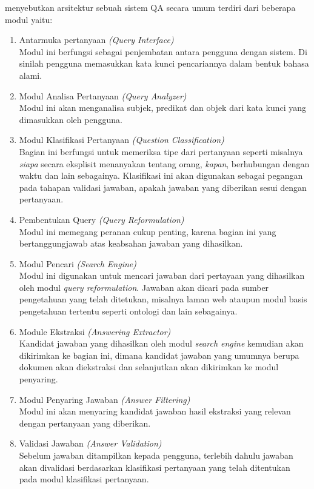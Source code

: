\citet*{ramprasath_hariharan} menyebutkan arsitektur sebuah sistem QA secara umum terdiri dari beberapa modul yaitu:
\begin{enumerate}
	\item Antarmuka pertanyaan \emph{(Query Interface)} \\
		Modul ini berfungsi sebagai penjembatan antara pengguna dengan sistem. Di sinilah pengguna memasukkan kata kunci pencariannya dalam bentuk bahasa alami.
	\item Modul Analisa Pertanyaan \emph{(Query Analyzer)} \\
		Modul ini akan menganalisa subjek, predikat dan objek dari kata kunci yang dimasukkan oleh pengguna.
	\item Modul Klasifikasi Pertanyaan \emph{(Question Classification)} \\
		Bagian ini berfungsi untuk memeriksa tipe dari pertanyaan seperti misalnya \emph{siapa} secara eksplisit menanyakan tentang orang, \emph{kapan}, berhubungan dengan waktu dan lain sebagainya. Klasifikasi ini akan digunakan sebagai pegangan pada tahapan validasi jawaban, apakah jawaban yang diberikan sesui dengan pertanyaan.
	\item Pembentukan Query \emph{(Query Reformulation)} \\
		Modul ini memegang peranan cukup penting, karena bagian ini yang bertanggungjawab atas keabsahan jawaban yang dihasilkan.
	\item Modul Pencari \emph{(Search Engine)} \\ 
		Modul ini digunakan untuk mencari jawaban dari pertayaan yang dihasilkan oleh modul \emph{query reformulation}. Jawaban akan dicari pada sumber pengetahuan yang telah ditetukan, misalnya laman web ataupun modul basis pengetahuan tertentu seperti ontologi dan lain sebagainya.
	\item Module Ekstraksi \emph{(Answering Extractor)} \\ 
		Kandidat jawaban yang dihasilkan oleh modul \emph{search engine} kemudian akan dikirimkan ke bagian ini, dimana kandidat jawaban yang umumnya berupa dokumen akan diekstraksi dan selanjutkan akan dikirimkan ke modul penyaring.
	\item Modul Penyaring Jawaban \emph{(Answer Filtering)} \\
		Modul ini akan menyaring kandidat jawaban hasil ekstraksi yang relevan dengan pertanyaan yang diberikan.
	\item Validasi Jawaban \emph{(Answer Validation)} \\ 
		Sebelum jawaban ditampilkan kepada pengguna, terlebih dahulu jawaban akan divalidasi berdasarkan klasifikasi pertanyaan yang telah ditentukan pada modul klasifikasi pertanyaan.
\end{enumerate}
